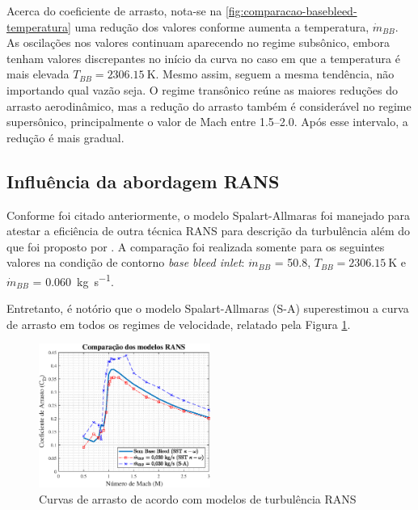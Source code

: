 Acerca do coeficiente de arrasto, nota-se na \autoref{fig:comparacao-basebleed-temperatura} uma redução dos valores conforme aumenta a temperatura, \(\Dot{m}_{BB}\). As oscilações nos valores continuam aparecendo no regime subsônico, embora tenham valores discrepantes no início da curva no caso em que a temperatura é mais elevada \(T_{BB} = \qty{2306,15}{\kelvin}\). Mesmo assim, seguem a mesma tendência, não importando qual vazão seja. O regime transônico reúne as maiores reduções do arrasto aerodinâmico, mas a redução do arrasto também é considerável no regime supersônico, principalmente o valor de Mach entre \numrange{1,5}{2,0}. Após esse intervalo, a redução é mais gradual.

\subsection{Influência da abordagem RANS}\label{subsec:resultados-com-basebleed-RANS}

Conforme foi citado anteriormente, o modelo Spalart-Allmaras \cite{Spalart1992} foi manejado para atestar a eficiência de outra técnica RANS para descrição da turbulência além do que foi proposto por \citeauthor{Menter1994TwoequationET}. A comparação foi realizada somente para os seguintes valores na condição de contorno \textit{base bleed inlet}: \(\Dot{m}_{BB}\) = \qty{50,8}{\millimetre}, \(T_{BB} = \qty{2306,15}{\kelvin}\) e \(\Dot{m}_{BB}\) = \qty{0,060}{\kilogram\per\second}.

Entretanto, é notório que o modelo Spalart-Allmaras (S-A) superestimou a curva de arrasto em todos os regimes de velocidade, relatado pela Figura \ref{fig:comparacao-bb-rans}.

\begin{figure}[!ht]
    \centering
    \includegraphics[width=0.5\textwidth]{cd-combasebleed-rans.eps}
 	\caption{Curvas de arrasto de acordo com modelos de turbulência RANS}
    \label{fig:comparacao-bb-rans}
\end{figure}


